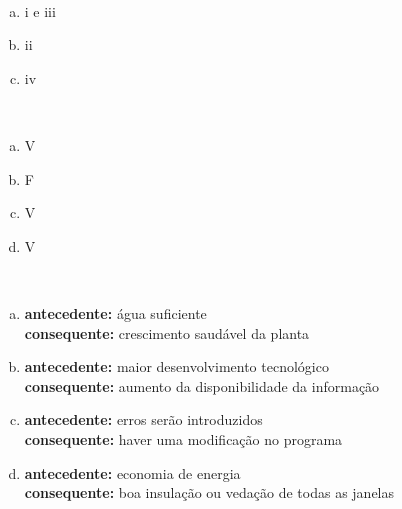 \begin{Gabarito}{1}
~
    \begin{multicols}{4}
          \begin{enumerate}[a)]
            \item i e iii
            \item ii
            \item iv
          \end{enumerate}
        \end{multicols}
  
\end{Gabarito}
\begin{Gabarito}{2}
~
    \begin{multicols}{4}
      \begin{enumerate}[a)]
        \item V
        \item F
        \item V
        \item V
      \end{enumerate}
    \end{multicols}
  
\end{Gabarito}
\begin{Gabarito}{3}
~
        \begin{enumerate}[a)]
          \item \textbf{antecedente:} água suficiente \\ \textbf{consequente:} crescimento saudável da planta
          \item \textbf{antecedente:} maior desenvolvimento tecnológico \\ \textbf{consequente:} aumento da disponibilidade da informação
          \item \textbf{antecedente:} erros serão introduzidos \\ \textbf{consequente:} haver uma modificação no programa
          \item \textbf{antecedente:} economia de energia \\ \textbf{consequente:} boa insulação ou vedação de todas as janelas
        \end{enumerate}
  
\end{Gabarito}
